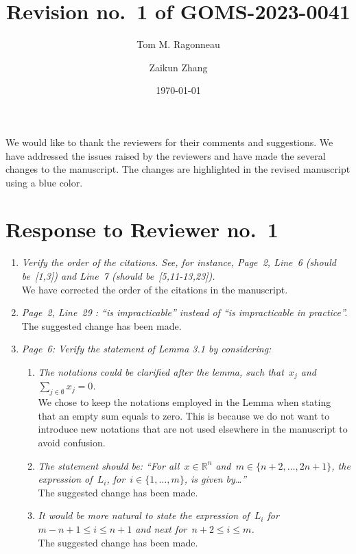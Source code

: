 \documentclass{article}
\title{Revision no.\ 1 of GOMS-2023-0041}
\author{Tom M. Ragonneau \and Zaikun Zhang}
\date{\today}
\begin{document}
\maketitle

We would like to thank the reviewers for their comments and suggestions.
We have addressed the issues raised by the reviewers and have made the several changes to the manuscript.
The changes are highlighted in the revised manuscript using a blue color.

\section{Response to Reviewer no.\ 1}

\begin{enumerate}
    \item \textit{Verify the order of the citations. See, for instance, Page~2, Line~6 (should be~[1,3]) and Line~7 (should be~[5,11-13,23]).}\\
    We have corrected the order of the citations in the manuscript.
    \item \textit{Page~2, Line~29 : ``is impracticable'' instead of ``is impracticable in practice''.}\\
    The suggested change has been made.
    \item \textit{Page~6: Verify the statement of Lemma 3.1 by considering:}
    \begin{enumerate}
        \item \textit{The notations could be clarified after the lemma, such that~$x_j$ and~$\sum_{j \in \emptyset} x_j = 0$.}\\
        We chose to keep the notations employed in the Lemma when stating that an empty sum equals to zero.
        This is because we do not want to introduce new notations that are not used elsewhere in the manuscript to avoid confusion.
        \item \textit{The statement should be: ``For all~$x \in \mathbb{R}^n$ and~$m \in \{ n + 2, \dots, 2n + 1 \}$, the expression of~$L_i$, for~$i \in \{ 1, \dots, m \}$, is given by\dots''}\\
        The suggested change has been made.
        \item \textit{It would be more natural to state the expression of~$L_i$ for~$m - n + 1 \le i \le n + 1$ and next for~$n + 2 \le i \le m$.}\\
        The suggested change has been made.
    \end{enumerate}

\end{enumerate}
\end{document}

